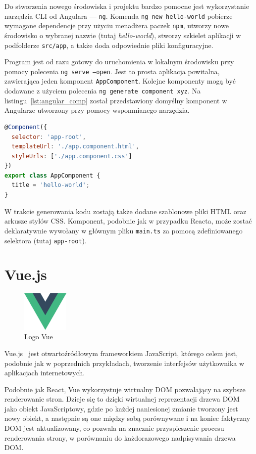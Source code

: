 \documentclass[twoside,a4paper]{report}
\begin{document}
Do stworzenia nowego środowiska i projektu bardzo pomocne jest wykorzystanie narzędzia CLI od Angulara --- \texttt{ng}.
Komenda \texttt{ng new hello-world} pobierze wymagane dependencje przy użyciu menadżera paczek \texttt{npm}, utworzy nowe środowisko o wybranej nazwie (tutaj \textit{hello-world}), stworzy szkielet aplikacji w podfolderze \texttt{src/app}, a także doda odpowiednie pliki konfiguracyjne.

Program jest od razu gotowy do uruchomienia w lokalnym środowisku przy pomocy polecenia \texttt{ng serve --open}.
Jest to prosta aplikacja powitalna, zawierająca jeden komponent \texttt{AppComponent}.
Kolejne komponenty mogą być dodawane z użyciem polecenia \texttt{ng generate component xyz}.
Na listingu~\ref{lst:angular_comp} został przedstawiony domyślny komponent w Angularze utworzony przy pomocy wspomnianego narzędzia.

\begin{lstlisting}[caption={Domyślny komponent w Angularze},label={lst:angular_comp},language=JavaScript]
@Component({
  selector: 'app-root',
  templateUrl: './app.component.html',
  styleUrls: ['./app.component.css']
})
export class AppComponent {
  title = 'hello-world';
}
\end{lstlisting}

W trakcie generowania kodu zostają także dodane szablonowe pliki HTML oraz arkusze stylów CSS\@.
Komponent, podobnie jak w przypadku Reacta, może zostać deklaratywnie wywołany w głównym pliku \texttt{main.ts} za pomocą zdefiniowanego selektora (tutaj \texttt{app-root}).

\section{Vue.js}
\begin{figure}
    \centering
    \includegraphics[width=0.2\textwidth]{img/logo_vue.png}
    \caption*{Logo Vue}\label{fig:logo_vue}
\end{figure}
Vue.js~\cite{vuejsdocs} jest otwartoźródłowym frameworkiem JavaScript, którego celem jest, podobnie jak w poprzednich przykładach, tworzenie interfejsów użytkownika w aplikacjach internetowych.

Podobnie jak React, Vue wykorzystuje wirtualny DOM pozwalający na szybsze renderowanie stron.
Dzieje się to dzięki wirtualnej reprezentacji drzewa DOM jako obiekt JavaScriptowy, gdzie po każdej naniesionej zmianie tworzony jest nowy obiekt, a następnie są one między sobą porównywane i na koniec faktyczny DOM jest aktualizowany, co pozwala na znacznie przyspieszenie procesu renderowania strony, w porównaniu do każdorazowego nadpisywania drzewa DOM\@.
\end{document}
